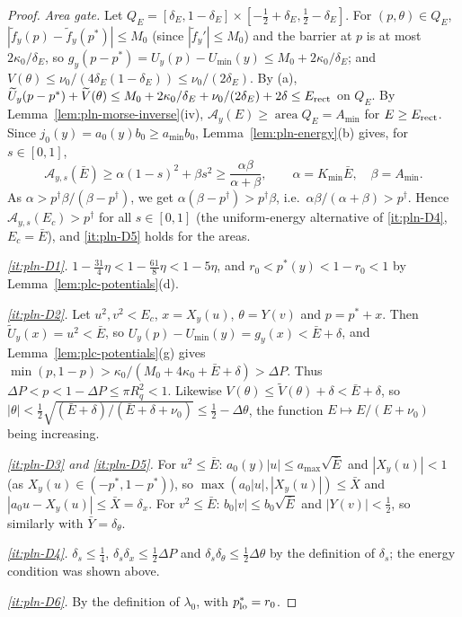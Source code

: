 \begin{proof}
\emph{Area gate.} Let $Q_E=[\delta_E,1-\delta_E]\times[-\frac12+\delta_E,\frac12-\delta_E]$. For $(p,\theta)\in Q_E$,
$|\tilde f_y(p)-\tilde f_y(p^*)|\le M_0$ (since $|\tilde f_y'|\le M_0$) and the barrier at $p$ is at most $2\kappa_0/\delta_E$,
so $g_y(p-p^*)=U_y(p)-U_{\min}(y)\le M_0+2\kappa_0/\delta_E$; and $V(\theta)\le\nu_0/(4\delta_E(1-\delta_E))\le
\nu_0/(2\delta_E)$. By (a), $\widetilde U_y(p-p^*)+\widetilde V(\theta)\le M_0+2\kappa_0/\delta_E+\nu_0/(2\delta_E)+2\delta
\le E_{\rm rect}$ on $Q_E$. By Lemma~\ref{lem:pln-morse-inverse}(iv), $\mathcal A_y(E)\ge\operatorname{area}Q_E=A_{\min}$ for
$E\ge E_{\rm rect}$. Since $j_0(y)=a_0(y)b_0\ge a_{\min}b_0$, Lemma~\ref{lem:pln-energy}(b) gives, for $s\in[0,1]$,
\[
 \mathcal A_{y,s}(\bar E)\ge\alpha(1-s)^2+\beta s^2\ge\frac{\alpha\beta}{\alpha+\beta},\qquad
 \alpha=K_{\min}\bar E,\quad\beta=A_{\min}.
\]
As $\alpha>p^\dagger\beta/(\beta-p^\dagger)$, we get $\alpha(\beta-p^\dagger)>p^\dagger\beta$, i.e.\
$\alpha\beta/(\alpha+\beta)>p^\dagger$. Hence $\mathcal A_{y,s}(E_c)>p^\dagger$ for all $s\in[0,1]$ (the uniform-energy
alternative of \ref{it:pln-D4}, $E_c=\bar E$), and \ref{it:pln-D5} holds for the areas.

\emph{\ref{it:pln-D1}.} $1-\frac{31}4\eta<1-\frac{61}8\eta<1-5\eta$, and $r_0<p^*(y)<1-r_0<1$ by
Lemma~\ref{lem:plc-potentials}(d).

\emph{\ref{it:pln-D2}.} Let $u^2,v^2<E_c$, $x=X_y(u)$, $\theta=Y(v)$ and $p=p^*+x$. Then $\widetilde U_y(x)=u^2<\bar E$, so
$U_y(p)-U_{\min}(y)=g_y(x)<\bar E+\delta$, and Lemma~\ref{lem:plc-potentials}(g) gives
$\min(p,1-p)>\kappa_0/(M_0+4\kappa_0+\bar E+\delta)>\Delta P$. Thus $\Delta P<p<1-\Delta P\le\pi R_q^2<1$. Likewise
$V(\theta)\le\widetilde V(\theta)+\delta<\bar E+\delta$, so $|\theta|<\frac12\sqrt{(\bar E+\delta)/(\bar E+\delta+\nu_0)}
\le\frac12-\Delta\theta$, the function $E\mapsto E/(E+\nu_0)$ being increasing.

\emph{\ref{it:pln-D3} and \ref{it:pln-D5}.} For $u^2\le\bar E$: $a_0(y)|u|\le a_{\max}\sqrt{\bar E}$ and $|X_y(u)|<1$ (as
$X_y(u)\in(-p^*,1-p^*)$), so $\max(a_0|u|,|X_y(u)|)\le\bar X$ and $|a_0u-X_y(u)|\le\bar X=\delta_x$. For $v^2\le\bar E$:
$b_0|v|\le b_0\sqrt{\bar E}$ and $|Y(v)|<\frac12$, so similarly with $\bar Y=\delta_\theta$.

\emph{\ref{it:pln-D4}.} $\delta_s\le\frac14$, $\delta_s\delta_x\le\frac12\Delta P$ and $\delta_s\delta_\theta\le\frac12\Delta\theta$ by
the definition of $\delta_s$; the energy condition was shown above.

\emph{\ref{it:pln-D6}.} By the definition of $\lambda_0$, with $p^*_{\rm lo}=r_0$.


\end{proof}
